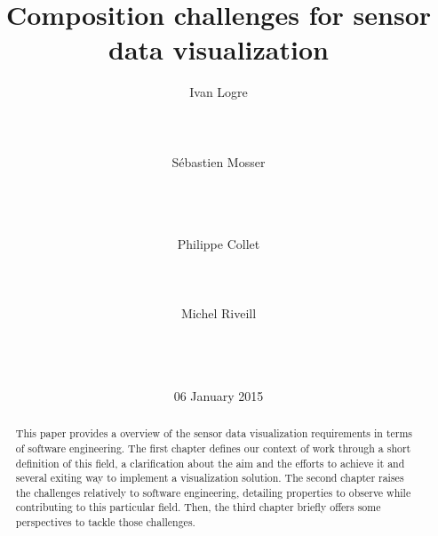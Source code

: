 \documentclass{acm_proc_article-sp}
\begin{document}
\title{Composition challenges for sensor data visualization}

\author{
\alignauthor Ivan Logre\\
       \\
       \\
       \\
\alignauthor S{\'e}bastien Mosser\\
       \\
       \\
       \\
\and
\alignauthor Philippe Collet\\
       \\
       \\
       \\
\alignauthor Michel Riveill\\
       \\
       \\
       \\
}

\date{06 January 2015}

\maketitle
\begin{abstract}
This paper provides a overview of the sensor data visualization requirements in
terms of software engineering. The first chapter defines our context of work
through a short definition of this field, a clarification about the aim and the
efforts to achieve it and several exiting way to implement a visualization solution.
The second chapter raises the challenges relatively to software engineering,
detailing properties to observe while contributing to this particular field.
Then, the third chapter briefly offers some perspectives to tackle those challenges.
\end{abstract}
\end{document}
